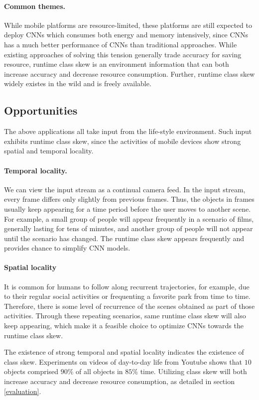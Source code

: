 \documentclass[pageno]{jpaper}
\begin{document}
\paragraph{Common themes.} While mobile platforms are resource-limited, these platforms are still expected to deploy CNNs which consumes both energy and memory intensively, since CNNs has a much better performance of CNNs than traditional approaches. While existing approaches of solving this tension generally trade accuracy for saving resource, runtime class skew is an environment information that can both increase accuracy and decrease resource consumption. Further, runtime class skew widely existes in the wild and is freely available. 


\subsection{Opportunities}
The above applications all take input from the life-style environment. Such input exhibits runtime class skew, since the activities of mobile devices show strong spatial and temporal locality. 

\paragraph{Temporal locality.} We can view the input stream as a continual camera feed. In the input stream, every frame differs only slightly from previous frames. Thus, the objects in frames usually keep appearing for a time period before the user moves to another scene. For example, a small group of people will appear frequently in a scenario of films, generally lasting for tens of minutes, and another group of people will not appear until the scenario has changed. The runtime class skew appears frequently and provides chance to simplify CNN models. 

\paragraph{Spatial locality} It is common for humans to follow along recurrent trajectories, for example, due to their regular social activities or frequenting a favorite park from time to time. Therefore, there is some level of recurrence of the scenes obtained as part of those activities. Through these repeating scenarios, same runtime class skew will also keep appearing, which make it a feasible choice to optimize CNNs towards the runtime class skew.

The existence of strong temporal and spatial locality indicates the existence of class skew. Experiments on videos of day-to-day life from Youtube \cite{shen2016fast} shows that $10$ objects comprised $90$\% of all objects in $85$\% time. Utilizing class skew will both increase accuracy and decrease resource consumption, as detailed in section \ref{evaluation}. 
\end{document}
